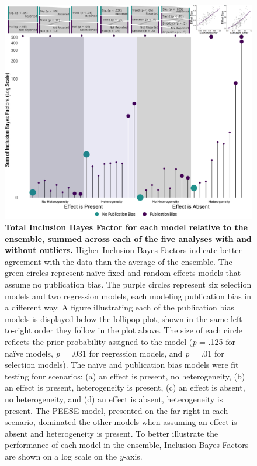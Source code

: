 \documentclass[
  man, donotrepeattitle,floatsintext]{apa7}
\begin{document}
\begin{figure}

{\centering \includegraphics[width=0.99\linewidth]{../../figs/fig3} 

}

\caption{\linespread{1.15}\selectfont \small \normalfont \textbf{Total Inclusion Bayes Factor for each model relative to the ensemble, summed across each of the five analyses with and without outliers.} Higher Inclusion Bayes Factors indicate better agreement with the data than the average of the ensemble. The green circles represent naïve fixed and random effects models that assume no publication bias. The purple circles represent six selection models and two regression models, each modeling publication bias in a different way. A figure illustrating each of the publication bias models is displayed below the lollipop plot, shown in the same left-to-right order they follow in the plot above. The size of each circle reflects the prior probability assigned to the model (\emph{p} = .125 for naïve models, \emph{p} = .031 for regression models, and \emph{p} = .01 for selection models). The naïve and publication bias models were fit testing four scenarios: (a) an effect is present, no heterogeneity, (b) an effect is present, heterogeneity is present, (c) an effect is absent, no heterogeneity, and (d) an effect is absent, heterogeneity is present. The PEESE model, presented on the far right in each scenario, dominated the other models when assuming an effect is absent and heterogeneity is present. To better illustrate the performance of each model in the ensemble, Inclusion Bayes Factors are shown on a log scale on the \emph{y}-axis.}\label{fig:fig3}
\end{figure}
\end{document}
